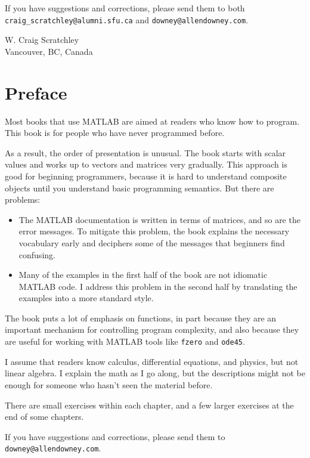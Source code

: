 \documentclass{book}
\begin{document}
If you have suggestions and corrections, please send them to both
{\tt craig\_scratchley@alumni.sfu.ca} and {\tt downey@allendowney.com}.

\noindent W. Craig Scratchley \\
\noindent Vancouver, BC, Canada \\

\chapter{Preface}
Most books that use MATLAB are aimed at readers who know how
to program.  This book is for people who have never programmed
before.

As a result, the order of presentation is unusual.  The book starts
with scalar values and works up to vectors and matrices very
gradually.  This approach is good for beginning programmers, because
it is hard to understand composite objects until you understand basic
programming semantics.  But there are problems:

\begin{itemize}

\item The MATLAB documentation is written in terms of matrices,
and so are the error messages.
To mitigate this problem, the book explains the necessary
vocabulary early and deciphers some of the messages that
beginners find confusing.

\item Many of the examples in the first half of the book are
not idiomatic MATLAB code.  I address this problem in the second
half by translating the examples into a more standard style.

\end{itemize}

The book puts a lot of emphasis on functions, in part because they are
an important mechanism for controlling program complexity, and also
because they are useful for working with MATLAB tools like {\tt fzero}
and {\tt ode45}.

I assume that readers know calculus, differential equations, and
physics, but not linear algebra.  I explain the math as I go along,
but the descriptions might not be enough for someone who hasn't seen
the material before.

There are small exercises within each chapter, and a few larger
exercises at the end of some chapters.

If you have suggestions and corrections, please send them to
{\tt downey@allendowney.com}.
\end{document}
